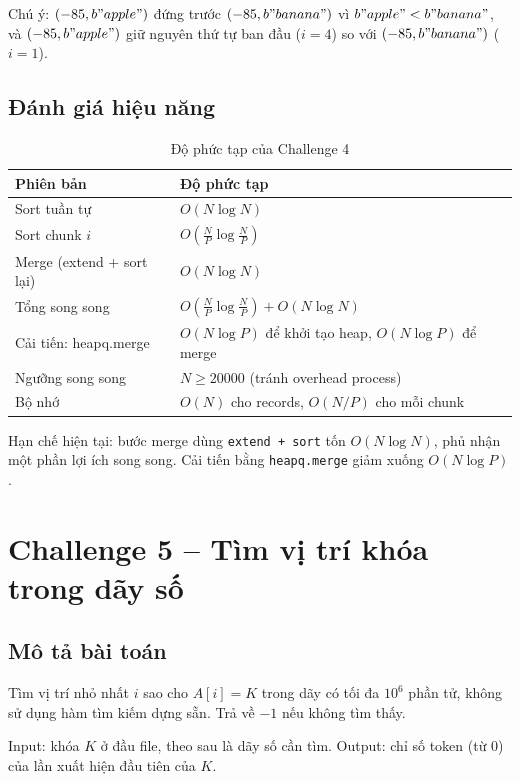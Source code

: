 \documentclass[12pt,a4paper]{article}
\begin{document}
Chú ý: $(-85, b"apple")$ đứng trước $(-85, b"banana")$ vì $b"apple" < b"banana"$, và $(-85, b"apple")$ giữ nguyên thứ tự ban đầu ($i=4$) so với $(-85, b"banana")$ ($i=1$).

\subsection{Đánh giá hiệu năng}

\begin{table}[H]
\centering
\caption{Độ phức tạp của Challenge 4}
\begin{tabularx}{\textwidth}{p{4.5cm}Y}
\toprule
\textbf{Phiên bản} & \textbf{Độ phức tạp} \\
\midrule
Sort tuần tự & $O(N \log N)$ \\
\midrule
\midrule
Sort chunk $i$ & $O(\frac{N}{P} \log \frac{N}{P})$ \\
Merge (extend + sort lại) & $O(N \log N)$ \\
Tổng song song & $O(\frac{N}{P} \log \frac{N}{P}) + O(N \log N)$ \\
\midrule
\midrule
Cải tiến: heapq.merge & $O(N \log P)$ để khởi tạo heap, $O(N \log P)$ để merge \\
\midrule
\midrule
Ngưỡng song song & $N \geq 20000$ (tránh overhead process) \\
\midrule
\midrule
Bộ nhớ & $O(N)$ cho records, $O(N/P)$ cho mỗi chunk \\
\bottomrule
\end{tabularx}
\end{table}

Hạn chế hiện tại: bước merge dùng \texttt{extend + sort} tốn $O(N \log N)$, phủ nhận một phần lợi ích song song. Cải tiến bằng \texttt{heapq.merge} giảm xuống $O(N \log P)$.

\section{Challenge 5 -- Tìm vị trí khóa trong dãy số}

\subsection{Mô tả bài toán}

Tìm vị trí nhỏ nhất $i$ sao cho $A[i] = K$ trong dãy có tối đa $10^6$ phần tử, không sử dụng hàm tìm kiếm dựng sẵn. Trả về $-1$ nếu không tìm thấy.

Input: khóa $K$ ở đầu file, theo sau là dãy số cần tìm. Output: chỉ số token (từ 0) của lần xuất hiện đầu tiên của $K$.
\end{document}
